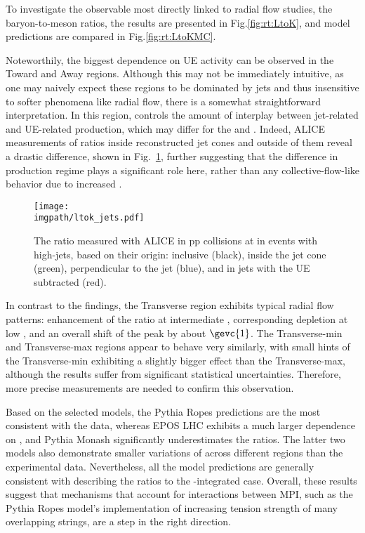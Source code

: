 To investigate the observable most directly linked to radial flow studies, the baryon-to-meson ratios, the \ltok results are presented in Fig.\ref{fig:rt:LtoK}, and model predictions are compared in Fig.\ref{fig:rt:LtoKMC}.

Noteworthily, the biggest dependence on UE activity can be observed in the Toward and Away regions. Although this may not be immediately intuitive, as one may naively expect these regions to be dominated by jets and thus insensitive to softer phenomena like radial flow, there is a somewhat straightforward interpretation. In this region, \RT controls the amount of interplay between jet-related and UE-related production, which may differ for the \KOs and \LA. Indeed, ALICE measurements of \ltok ratios inside reconstructed jet cones and outside of them reveal a drastic difference, shown in Fig.~\ref{fig:rt:ltokjets}, further suggesting that the difference in production regime plays a significant role here, rather than any collective-flow-like behavior due to increased \nmpi.

\begin{figure}[H]%
\texttt{[image: \\imgpath/ltok\_jets.pdf]}\\
\caption{The \ltok ratio measured with ALICE in pp collisions at  in events with high-\pt jets, based on their origin: inclusive (black), inside the jet cone (green), perpendicular to the jet (blue), and in jets with the UE subtracted (red). \cite{acharyaProductionKS0Jets2022}}
\label{fig:rt:ltokjets}
\end{figure}

In contrast to the \SOPT findings, the Transverse region exhibits typical radial flow patterns: enhancement of the ratio at intermediate \pt, corresponding depletion at low \pt, and an overall shift of the peak by about $\gevc{1}$. The Transverse-min and Transverse-max regions appear to behave very similarly, with small hints of the Transverse-min exhibiting a slightly bigger effect than the Transverse-max, although the results suffer from significant statistical uncertainties. Therefore, more precise measurements are needed to confirm this observation.

Based on the selected models, the Pythia Ropes predictions are the most consistent with the data, whereas EPOS LHC exhibits a much larger dependence on \RT, and Pythia Monash significantly underestimates the ratios. The latter two models also demonstrate smaller variations of \ltok across different regions than the experimental data. Nevertheless, all the model predictions are generally consistent with describing the ratios to the \RT-integrated case. Overall, these results suggest that mechanisms that account for interactions between MPI, such as the Pythia Ropes model's implementation of increasing tension strength of many overlapping strings, are a step in the right direction.

